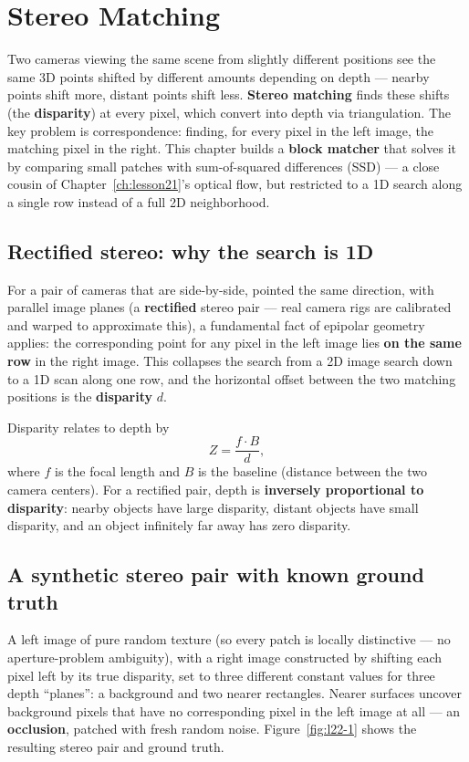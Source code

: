 \chapter{Stereo Matching}
\label{ch:lesson22}

Two cameras viewing the same scene from slightly different positions see the same 3D points shifted by different amounts depending on depth --- nearby points shift more, distant points shift less. \textbf{Stereo matching} finds these shifts (the \textbf{disparity}) at every pixel, which convert into depth via triangulation. The key problem is correspondence: finding, for every pixel in the left image, the matching pixel in the right. This chapter builds a \textbf{block matcher} that solves it by comparing small patches with sum-of-squared differences (SSD) --- a close cousin of Chapter~\ref{ch:lesson21}'s optical flow, but restricted to a 1D search along a single row instead of a full 2D neighborhood.

\section{Rectified stereo: why the search is 1D}

For a pair of cameras that are side-by-side, pointed the same direction, with parallel image planes (a \textbf{rectified} stereo pair --- real camera rigs are calibrated and warped to approximate this), a fundamental fact of epipolar geometry applies: the corresponding point for any pixel in the left image lies \textbf{on the same row} in the right image. This collapses the search from a 2D image search down to a 1D scan along one row, and the horizontal offset between the two matching positions is the \textbf{disparity} $d$.

Disparity relates to depth by
\begin{equation}
Z = \frac{f \cdot B}{d},
\end{equation}
where $f$ is the focal length and $B$ is the baseline (distance between the two camera centers). For a rectified pair, depth is \textbf{inversely proportional to disparity}: nearby objects have large disparity, distant objects have small disparity, and an object infinitely far away has zero disparity.

\section{A synthetic stereo pair with known ground truth}

A left image of pure random texture (so every patch is locally distinctive --- no aperture-problem ambiguity), with a right image constructed by shifting each pixel left by its true disparity, set to three different constant values for three depth ``planes'': a background and two nearer rectangles. Nearer surfaces uncover background pixels that have no corresponding pixel in the left image at all --- an \textbf{occlusion}, patched with fresh random noise. Figure~\ref{fig:l22-1} shows the resulting stereo pair and ground truth.

